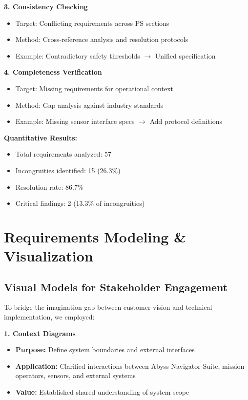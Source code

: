 \documentclass[12pt,a4paper]{article}
\begin{document}
\textbf{3. Consistency Checking}
\begin{itemize}
\item Target: Conflicting requirements across PS sections
\item Method: Cross-reference analysis and resolution protocols
\item Example: Contradictory safety thresholds $\rightarrow$ Unified specification
\end{itemize}

\textbf{4. Completeness Verification}
\begin{itemize}
\item Target: Missing requirements for operational context
\item Method: Gap analysis against industry standards
\item Example: Missing sensor interface specs $\rightarrow$ Add protocol definitions
\end{itemize}

\textbf{Quantitative Results:}
\begin{itemize}
\item Total requirements analyzed: 57
\item Incongruities identified: 15 (26.3\%)
\item Resolution rate: 86.7\%
\item Critical findings: 2 (13.3\% of incongruities)
\end{itemize}

\newpage

\section{Requirements Modeling \& Visualization}
\label{sec:modeling}

\subsection{Visual Models for Stakeholder Engagement}
To bridge the imagination gap between customer vision and technical implementation, we employed:

\textbf{1. Context Diagrams}
\begin{itemize}
\item \textbf{Purpose:} Define system boundaries and external interfaces
\item \textbf{Application:} Clarified interactions between Abyss Navigator Suite, mission operators, sensors, and external systems
\item \textbf{Value:} Established shared understanding of system scope
\end{itemize}
\end{document}
